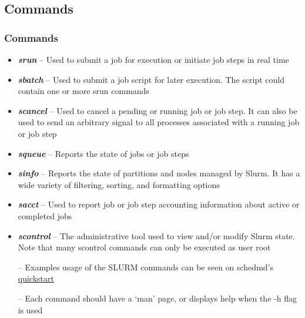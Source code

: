 \subsection{Commands}
\begin{frame}
\frametitle{Commands}
\begin{itemize}
	\item \emph{\textbf{srun}} --  Used to submit a job for execution or initiate job steps in real time
	\item \emph{\textbf{sbatch}} -- Used to submit a job script for later execution. The script could contain one or more srun commands
	\item \emph{\textbf{scancel}} -- Used to cancel a pending or running job or job step. It can also be used to send an arbitrary signal to all processes associated with a running job or job step
	\item \emph{\textbf{squeue}} -- Reports the state of jobs or job steps
	\item \emph{\textbf{sinfo}} -- Reports the state of partitions and nodes managed by Slurm. It has a wide variety of filtering, sorting, and formatting options
	\item \emph{\textbf{sacct}} -- Used to report job or job step accounting information about active or completed jobs
	\item \emph{\textbf{scontrol}} -- The administrative tool used to view and/or modify Slurm state. Note that many scontrol commands can only be executed as user root
\end{itemize}
\begin{itemize}\footnotesize
	\item[--] Examples usage of the SLURM commands can be seen on schedmd's \href{http://slurm.schedmd.com/quickstart.html}{quickstart}
	\item[--] Each command should have a `man' page, or displays help when the -h flag is used
\end{itemize}
\end{frame}

